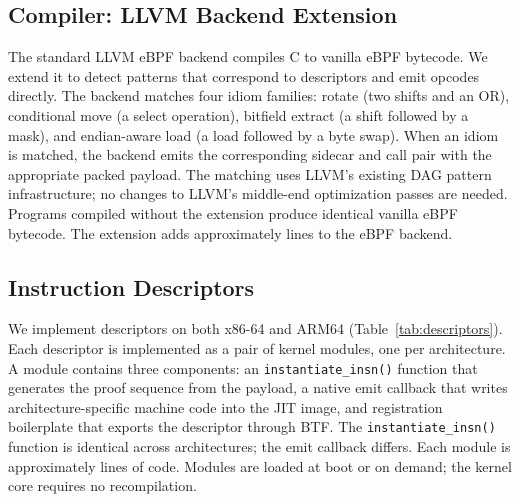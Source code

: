 \subsection{Compiler: LLVM Backend Extension}
\label{subsec:llvm}

The standard LLVM eBPF backend compiles C to vanilla eBPF bytecode. We extend it to detect patterns that correspond to \lang descriptors and emit \lang opcodes directly. The backend matches four idiom families: rotate (two shifts and an OR), conditional move (a select operation), bitfield extract (a shift followed by a mask), and endian-aware load (a load followed by a byte swap). When an idiom is matched, the backend emits the corresponding sidecar and call pair with the appropriate packed payload. The matching uses LLVM's existing DAG pattern infrastructure; no changes to LLVM's middle-end optimization passes are needed. Programs compiled without the \lang extension produce identical vanilla eBPF bytecode. The extension adds approximately  lines to the eBPF backend.

\subsection{Instruction Descriptors}
\label{subsec:descriptors}

We implement  \lang descriptors on both x86-64 and ARM64 (Table~\ref{tab:descriptors}). Each descriptor is implemented as a pair of kernel modules, one per architecture. A module contains three components: an \texttt{instantiate\_insn()} function that generates the proof sequence from the payload, a native emit callback that writes architecture-specific machine code into the JIT image, and registration boilerplate that exports the descriptor through BTF. The \texttt{instantiate\_insn()} function is identical across architectures; the emit callback differs. Each module is approximately  lines of code. Modules are loaded at boot or on demand; the kernel core requires no recompilation.